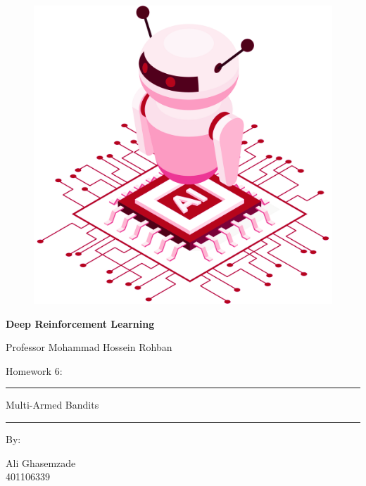 \documentclass[12pt]{article}
\begin{document}
\thispagestyle{plain}

\begin{center}

\vspace*{-1.5cm}
\begin{figure}[!h]
    \centering
    \includegraphics[width=0.7\linewidth]{figs/cover-std.png}
\end{figure}

{

{\color{DarkBlue} {\fontsize{30}{50} \textbf{
Deep Reinforcement Learning
}}}

{\color{DarkBlue} {\Large
Professor Mohammad Hossein Rohban
}}
}


\vspace{20pt}

{


{\color{RedOrange}
{\Large
Homework 6:
}\\
}
{\color{BrickRed}
\rule{12cm}{0.5pt}

{\Huge
Multi-Armed Bandits
}
\rule{12cm}{0.5pt}
}

\vspace{10pt}

{\color{RoyalPurple} { \small By:} } \\
\vspace{10pt}

{\color{Blue} { \LARGE Ali Ghasemzade } } \\
\vspace{5pt}
{\color{RoyalBlue} { \Large 401106339 } }


}
\end{center}
\end{document}
